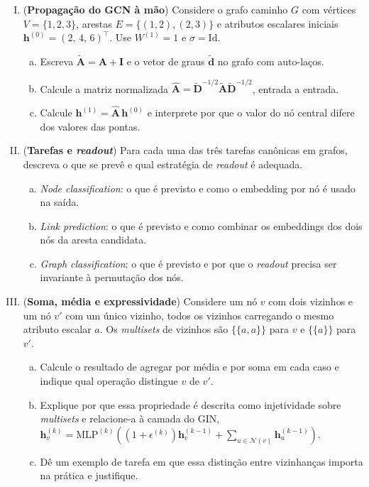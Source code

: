 \documentclass{dlproblemset}
\begin{document}
\begin{enumerate}[I)]

    \item (\textbf{Propagação do GCN à mão}) Considere o grafo caminho $G$ com vértices $V = \{1,2,3\}$, arestas $E = \{(1,2),(2,3)\}$ e atributos escalares iniciais $\mathbf{h}^{(0)} = (2,\, 4,\, 6)^\top$. Use $W^{(1)} = 1$ e $\sigma = \mathrm{Id}$.
    \begin{enumerate}[(a)]
        \item Escreva $\tilde{\mathbf{A}} = \mathbf{A} + \mathbf{I}$ e o vetor de graus $\tilde{\mathbf{d}}$ no grafo com auto-laços.
        \item Calcule a matriz normalizada $\hat{\mathbf{A}} = \tilde{\mathbf{D}}^{-1/2} \tilde{\mathbf{A}} \tilde{\mathbf{D}}^{-1/2}$, entrada a entrada.
        \item Calcule $\mathbf{h}^{(1)} = \hat{\mathbf{A}}\, \mathbf{h}^{(0)}$ e interprete por que o valor do nó central difere dos valores das pontas.
    \end{enumerate}

    \item (\textbf{Tarefas e \textit{readout}}) Para cada uma das três tarefas canônicas em grafos, descreva o que se prevê e qual estratégia de \textit{readout} é adequada.
    \begin{enumerate}[(a)]
        \item \textit{Node classification}: o que é previsto e como o embedding por nó é usado na saída.
        \item \textit{Link prediction}: o que é previsto e como combinar os embeddings dos dois nós da aresta candidata.
        \item \textit{Graph classification}: o que é previsto e por que o \textit{readout} precisa ser invariante à permutação dos nós.
    \end{enumerate}

    \item {} (\textbf{Soma, média e expressividade}) Considere um nó $v$ com dois vizinhos e um nó $v'$ com um único vizinho, todos os vizinhos carregando o mesmo atributo escalar $a$. Os \textit{multisets} de vizinhos são $\{\!\!\{a, a\}\!\!\}$ para $v$ e $\{\!\!\{a\}\!\!\}$ para $v'$.
    \begin{enumerate}[(a)]
        \item Calcule o resultado de agregar por média e por soma em cada caso e indique qual operação distingue $v$ de $v'$.
        \item Explique por que essa propriedade é descrita como injetividade sobre \textit{multisets} e relacione-a à camada do GIN, $\mathbf{h}^{(k)}_v = \mathrm{MLP}^{(k)}((1 + \epsilon^{(k)}) \mathbf{h}^{(k-1)}_v + \sum_{u \in \mathcal{N}(v)} \mathbf{h}^{(k-1)}_u)$.
        \item Dê um exemplo de tarefa em que essa distinção entre vizinhanças importa na prática e justifique.
    \end{enumerate}


\end{enumerate}
\end{document}
